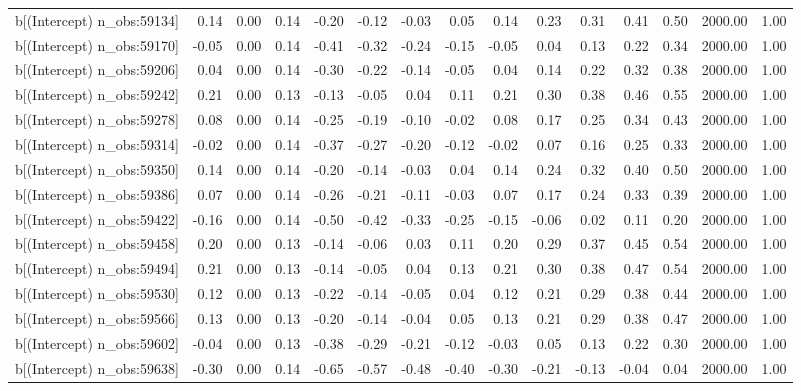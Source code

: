 \begin{table}[ht]
\begin{tabular}{rrrrrrrrrrrrrrr}
  b[(Intercept) n\_obs:59134] & 0.14 & 0.00 & 0.14 & -0.20 & -0.12 & -0.03 & 0.05 & 0.14 & 0.23 & 0.31 & 0.41 & 0.50 & 2000.00 & 1.00 \\ 
  b[(Intercept) n\_obs:59170] & -0.05 & 0.00 & 0.14 & -0.41 & -0.32 & -0.24 & -0.15 & -0.05 & 0.04 & 0.13 & 0.22 & 0.34 & 2000.00 & 1.00 \\ 
  b[(Intercept) n\_obs:59206] & 0.04 & 0.00 & 0.14 & -0.30 & -0.22 & -0.14 & -0.05 & 0.04 & 0.14 & 0.22 & 0.32 & 0.38 & 2000.00 & 1.00 \\ 
  b[(Intercept) n\_obs:59242] & 0.21 & 0.00 & 0.13 & -0.13 & -0.05 & 0.04 & 0.11 & 0.21 & 0.30 & 0.38 & 0.46 & 0.55 & 2000.00 & 1.00 \\ 
  b[(Intercept) n\_obs:59278] & 0.08 & 0.00 & 0.14 & -0.25 & -0.19 & -0.10 & -0.02 & 0.08 & 0.17 & 0.25 & 0.34 & 0.43 & 2000.00 & 1.00 \\ 
  b[(Intercept) n\_obs:59314] & -0.02 & 0.00 & 0.14 & -0.37 & -0.27 & -0.20 & -0.12 & -0.02 & 0.07 & 0.16 & 0.25 & 0.33 & 2000.00 & 1.00 \\ 
  b[(Intercept) n\_obs:59350] & 0.14 & 0.00 & 0.14 & -0.20 & -0.14 & -0.03 & 0.04 & 0.14 & 0.24 & 0.32 & 0.40 & 0.50 & 2000.00 & 1.00 \\ 
  b[(Intercept) n\_obs:59386] & 0.07 & 0.00 & 0.14 & -0.26 & -0.21 & -0.11 & -0.03 & 0.07 & 0.17 & 0.24 & 0.33 & 0.39 & 2000.00 & 1.00 \\ 
  b[(Intercept) n\_obs:59422] & -0.16 & 0.00 & 0.14 & -0.50 & -0.42 & -0.33 & -0.25 & -0.15 & -0.06 & 0.02 & 0.11 & 0.20 & 2000.00 & 1.00 \\ 
  b[(Intercept) n\_obs:59458] & 0.20 & 0.00 & 0.13 & -0.14 & -0.06 & 0.03 & 0.11 & 0.20 & 0.29 & 0.37 & 0.45 & 0.54 & 2000.00 & 1.00 \\ 
  b[(Intercept) n\_obs:59494] & 0.21 & 0.00 & 0.13 & -0.14 & -0.05 & 0.04 & 0.13 & 0.21 & 0.30 & 0.38 & 0.47 & 0.54 & 2000.00 & 1.00 \\ 
  b[(Intercept) n\_obs:59530] & 0.12 & 0.00 & 0.13 & -0.22 & -0.14 & -0.05 & 0.04 & 0.12 & 0.21 & 0.29 & 0.38 & 0.44 & 2000.00 & 1.00 \\ 
  b[(Intercept) n\_obs:59566] & 0.13 & 0.00 & 0.13 & -0.20 & -0.14 & -0.04 & 0.05 & 0.13 & 0.21 & 0.29 & 0.38 & 0.47 & 2000.00 & 1.00 \\ 
  b[(Intercept) n\_obs:59602] & -0.04 & 0.00 & 0.13 & -0.38 & -0.29 & -0.21 & -0.12 & -0.03 & 0.05 & 0.13 & 0.22 & 0.30 & 2000.00 & 1.00 \\ 
  b[(Intercept) n\_obs:59638] & -0.30 & 0.00 & 0.14 & -0.65 & -0.57 & -0.48 & -0.40 & -0.30 & -0.21 & -0.13 & -0.04 & 0.04 & 2000.00 & 1.00 \\ 

\end{tabular}
\end{table}
